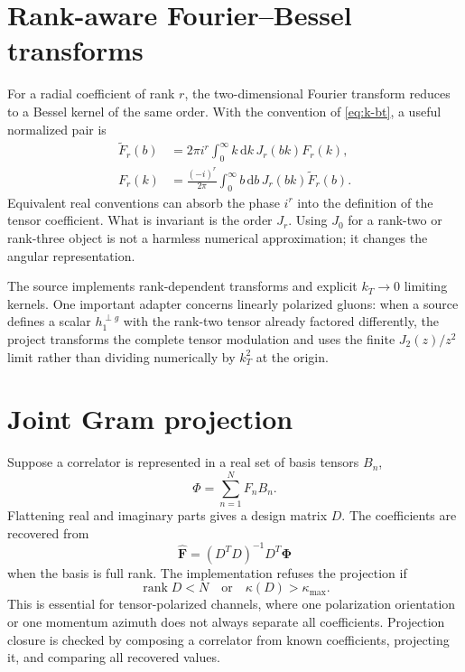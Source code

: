 \documentclass[11pt,oneside]{book}
\newcommand{\dd}{\mathrm{d}}
\newcommand{\rank}{\operatorname{rank}}
\begin{document}
\section{Rank-aware Fourier--Bessel transforms}

For a radial coefficient of rank $r$, the two-dimensional Fourier transform reduces to a Bessel kernel of the same order.  With the convention of \cref{eq:k-bt}, a useful normalized pair is
\begin{align}
 \widetilde F_r(b)
 &=2\pi i^r\int_0^\infty k\,\dd k\,J_r(bk)F_r(k),
 \label{eq:hankel-forward}\\
 F_r(k)
 &=\frac{(-i)^r}{2\pi}\int_0^\infty b\,\dd b\,J_r(bk)\widetilde F_r(b).
 \label{eq:hankel-inverse}
\end{align}
Equivalent real conventions can absorb the phase $i^r$ into the definition of the tensor coefficient.  What is invariant is the order $J_r$.  Using $J_0$ for a rank-two or rank-three object is not a harmless numerical approximation; it changes the angular representation.

The source implements rank-dependent transforms and explicit $k_T\to0$ limiting kernels.  One important adapter concerns linearly polarized gluons: when a source defines a scalar $h_{1}^{\perp g}$ with the rank-two tensor already factored differently, the project transforms the complete tensor modulation and uses the finite $J_2(z)/z^2$ limit rather than dividing numerically by $k_T^2$ at the origin.

\section{Joint Gram projection}

Suppose a correlator is represented in a real set of basis tensors $B_n$,
\begin{equation}
 \Phi=\sum_{n=1}^{N}F_nB_n.
\end{equation}
Flattening real and imaginary parts gives a design matrix $D$.  The coefficients are recovered from
\begin{equation}
 \widehat{\bm F}
 =(D^T D)^{-1}D^T\bm\Phi
 \label{eq:gram-projection}
\end{equation}
when the basis is full rank.  The implementation refuses the projection if
\begin{equation}
 \rank D<N
 \quad\text{or}\quad
 \kappa(D)>\kappa_{\max}.
 \label{eq:projector-failclosed}
\end{equation}
This is essential for tensor-polarized channels, where one polarization orientation or one momentum azimuth does not always separate all coefficients.  Projection closure is checked by composing a correlator from known coefficients, projecting it, and comparing all recovered values.
\end{document}
